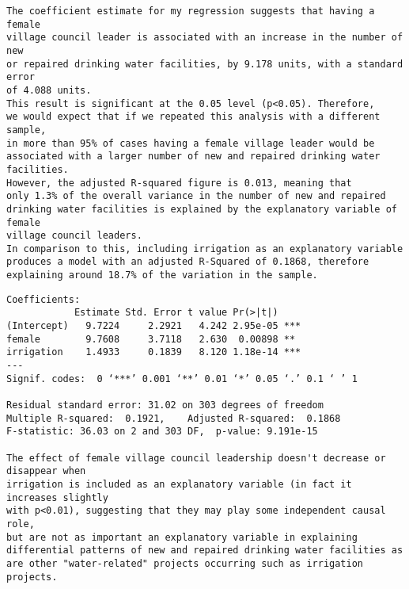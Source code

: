 \documentclass[12pt,letterpaper]{article}
\begin{document}
\begin{enumerate}
\begin{verbatim}
The coefficient estimate for my regression suggests that having a female
village council leader is associated with an increase in the number of new
or repaired drinking water facilities, by 9.178 units, with a standard error
of 4.088 units.
This result is significant at the 0.05 level (p<0.05). Therefore,
we would expect that if we repeated this analysis with a different sample,
in more than 95% of cases having a female village leader would be
associated with a larger number of new and repaired drinking water facilities.
However, the adjusted R-squared figure is 0.013, meaning that
only 1.3% of the overall variance in the number of new and repaired
drinking water facilities is explained by the explanatory variable of female
village council leaders.
In comparison to this, including irrigation as an explanatory variable
produces a model with an adjusted R-Squared of 0.1868, therefore
explaining around 18.7% of the variation in the sample.
\end{verbatim}	

\begin{verbatim}
Coefficients:
            Estimate Std. Error t value Pr(>|t|)    
(Intercept)   9.7224     2.2921   4.242 2.95e-05 ***
female        9.7608     3.7118   2.630  0.00898 ** 
irrigation    1.4933     0.1839   8.120 1.18e-14 ***
---
Signif. codes:  0 ‘***’ 0.001 ‘**’ 0.01 ‘*’ 0.05 ‘.’ 0.1 ‘ ’ 1

Residual standard error: 31.02 on 303 degrees of freedom
Multiple R-squared:  0.1921,	Adjusted R-squared:  0.1868 
F-statistic: 36.03 on 2 and 303 DF,  p-value: 9.191e-15

The effect of female village council leadership doesn't decrease or disappear when
irrigation is included as an explanatory variable (in fact it increases slightly
with p<0.01), suggesting that they may play some independent causal role,
but are not as important an explanatory variable in explaining
differential patterns of new and repaired drinking water facilities as
are other "water-related" projects occurring such as irrigation projects.
\end{verbatim}
\end{enumerate}
\end{document}
